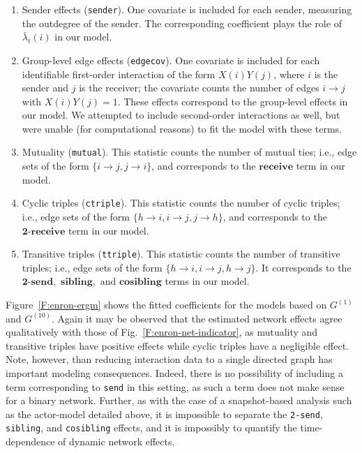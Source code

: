 \documentclass[final]{statsoc}
\begin{document}
\begin{enumerate}
  \item Sender effects (\texttt{sender}).  One covariate is included for each sender,
  measuring the outdegree of the sender.  The corresponding coefficient plays the role of $\bar \lambda_t(i)$ in our model.

  \item Group-level edge effects (\texttt{edgecov}).  One covariate is included for each
identifiable first-order interaction of the form $X(i) Y(j)$, where $i$ is the
sender and $j$ is the receiver; the covariate counts the number of edges $i
\to j$ with $X(i) Y(j) = 1$.  These effects correspond to the group-level
effects in our model.  We attempted to include second-order
interactions as well, but were unable (for computational reasons) to fit the model with these terms.

  \item Mutuality (\texttt{mutual}).  This statistic counts the number of
mutual ties; i.e., edge sets of the form $\{ i \to j, j \to i \}$, and corresponds to the
$\textbf{receive}$ term in our model.

  \item Cyclic triples (\texttt{ctriple}).  This statistic counts the number of
cyclic triples; i.e., edge sets of the form $\{ h \to i, i \to j, j \to h \}$, and
corresponds to the $\textbf{2-receive}$ term in our model.

  \item Transitive triples (\texttt{ttriple}).  This statistic counts the
number of transitive triples; i.e., edge sets of the form $\{ h \to i, i \to j, h
\to j \}$.  It corresponds to the $\textbf{2-send},$ $\textbf{sibling},$
and $\textbf{cosibling}$ terms in our model.
\end{enumerate}

Figure~\ref{F:enron-ergm} shows the fitted coefficients for the models based on
$G^{(1)}$ and $G^{(10)}$.  Again it may be observed that the estimated network effects agree
qualitatively with those of Fig.~\ref{F:enron-net-indicator}, as
mutuality and transitive triples have positive effects while cyclic triples
have a negligible effect.  Note, however, than reducing interaction data to a single directed graph has important modeling consequences.  Indeed, there is no possibility of including a term corresponding to \texttt{send} in this setting, as such a term does not make sense for a binary network.  Further, as with the case of a snapshot-based analysis such as the actor-model detailed above, it is impossible to separate the \texttt{2-send}, \texttt{sibling}, and \texttt{cosibling} effects, and it is impossibly to quantify the time-dependence of dynamic network effects.
\end{document}
